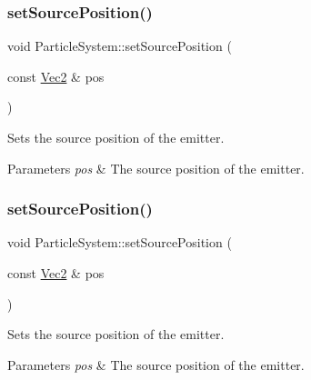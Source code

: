 \mbox{\label{classParticleSystem_a531acedca857579ae8228e2b4c38a978}} 
\subsubsection{\texorpdfstring{set\+Source\+Position()}{setSourcePosition()}\hspace{0.1cm}{\footnotesize\ttfamily [1/2]}}
{\footnotesize\ttfamily void Particle\+System\+::set\+Source\+Position (\begin{DoxyParamCaption}\item[{const \hyperlink{classVec2}{Vec2} \&}]{pos }\end{DoxyParamCaption})\hspace{0.3cm}{\ttfamily [inline]}}

Sets the source position of the emitter.


\begin{DoxyParams}{Parameters}
{\em pos} & The source position of the emitter. \\
\hline
\end{DoxyParams}
\mbox{\label{classParticleSystem_a531acedca857579ae8228e2b4c38a978}} 
\subsubsection{\texorpdfstring{set\+Source\+Position()}{setSourcePosition()}\hspace{0.1cm}{\footnotesize\ttfamily [2/2]}}
{\footnotesize\ttfamily void Particle\+System\+::set\+Source\+Position (\begin{DoxyParamCaption}\item[{const \hyperlink{classVec2}{Vec2} \&}]{pos }\end{DoxyParamCaption})\hspace{0.3cm}{\ttfamily [inline]}}

Sets the source position of the emitter.


\begin{DoxyParams}{Parameters}
{\em pos} & The source position of the emitter. \\
\hline
\end{DoxyParams}
\mbox{\label{classParticleSystem_af0cf94eabd9a698a38294e46df7a5058}} 
